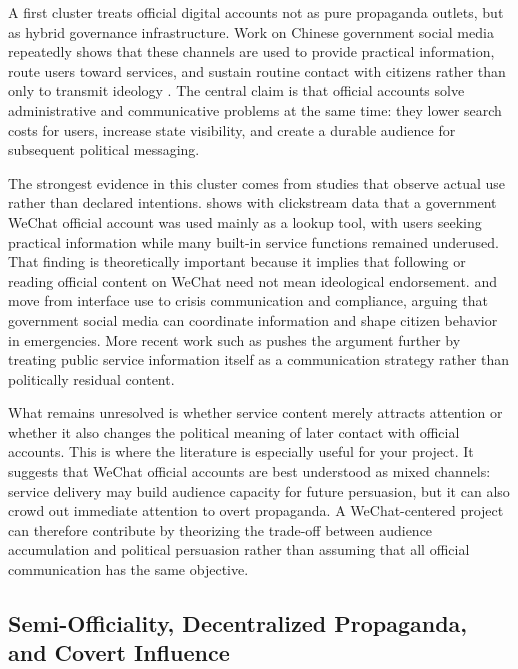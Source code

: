\documentclass[12pt]{article}
\begin{document}
        A first cluster treats official digital accounts not as pure propaganda outlets, but as hybrid governance infrastructure. Work on Chinese government social media repeatedly shows that these channels are used to provide practical information, route users toward services, and sustain routine contact with citizens rather than only to transmit ideology \citep{Zheng2013,ZhengZheng2014,jiang_2021_government_information_quarterly,guo_2021_information_management,li_2022_policy_internet,jiang_2023_jpart,yuan_2023_government_information_quarterly}. The central claim is that official accounts solve administrative and communicative problems at the same time: they lower search costs for users, increase state visibility, and create a durable audience for subsequent political messaging.

        The strongest evidence in this cluster comes from studies that observe actual use rather than declared intentions. \citet{jiang_2021_government_information_quarterly} shows with clickstream data that a government WeChat official account was used mainly as a lookup tool, with users seeking practical information while many built-in service functions remained underused. That finding is theoretically important because it implies that following or reading official content on WeChat need not mean ideological endorsement. \citet{li_2022_policy_internet} and \citet{jiang_2023_jpart} move from interface use to crisis communication and compliance, arguing that government social media can coordinate information and shape citizen behavior in emergencies. More recent work such as \citet{yu_2026_jcc} pushes the argument further by treating public service information itself as a communication strategy rather than politically residual content.

        What remains unresolved is whether service content merely attracts attention or whether it also changes the political meaning of later contact with official accounts. This is where the literature is especially useful for your project. It suggests that WeChat official accounts are best understood as mixed channels: service delivery may build audience capacity for future persuasion, but it can also crowd out immediate attention to overt propaganda. A WeChat-centered project can therefore contribute by theorizing the trade-off between audience accumulation and political persuasion rather than assuming that all official communication has the same objective.

        \subsection{Semi-Officiality, Decentralized Propaganda, and Covert Influence}
\end{document}
